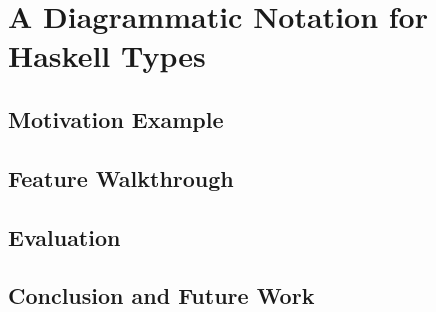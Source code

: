 


\chapter{A Diagrammatic Notation for Haskell Types}

\label{chapter5} 


\section{Motivation Example}

\section{Feature Walkthrough}

\section{Evaluation}

\section{Conclusion and Future Work}